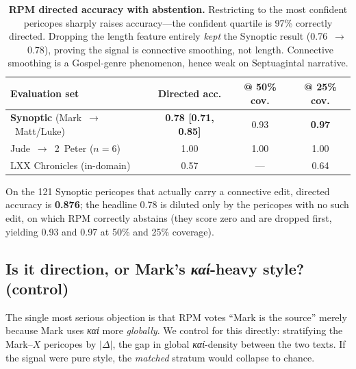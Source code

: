 \documentclass[11pt,letterpaper]{article}
\newcommand{\gk}[1]{{\greekfont\itshape #1}}
\newcommand{\tblhead}{\rowcolor{marine!12}}
\begin{document}
\begin{table}[H]
\centering
\begin{tabular}{lccc}
\toprule
\tblhead\textbf{Evaluation set} & \textbf{Directed acc.} & \textbf{@ 50\% cov.} & \textbf{@ 25\% cov.} \\
\midrule
\rowcolor{terracotta!12}\textbf{Synoptic} (Mark~$\rightarrow$~Matt/Luke) & \textbf{0.78 [0.71, 0.85]} & 0.93 & \textbf{0.97} \\
Jude~$\rightarrow$~2~Peter ($n=6$) & 1.00 & 1.00 & 1.00 \\
LXX Chronicles (in-domain) & 0.57 & --- & 0.64 \\
\bottomrule
\end{tabular}
\caption{\textbf{RPM directed accuracy with abstention.} Restricting to the most confident
pericopes sharply raises accuracy---the confident quartile is 97\% correctly directed. Dropping
the length feature entirely \textit{kept} the Synoptic result (0.76~$\rightarrow$~0.78), proving
the signal is connective smoothing, not length. Connective smoothing is a Gospel-genre
phenomenon, hence weak on Septuagintal narrative.}
\label{tab:rpm}
\end{table}

On the 121 Synoptic pericopes that actually carry a connective edit, directed accuracy is
\textbf{0.876}; the headline 0.78 is diluted only by the pericopes with no such edit, on which
RPM correctly abstains (they score zero and are dropped first, yielding 0.93 and 0.97 at 50\% and
25\% coverage).

\subsection{Is it direction, or Mark's \gk{καί}-heavy style? (control)}

The single most serious objection is that RPM votes ``Mark is the source'' merely because Mark
uses \gk{καί} more \textit{globally}. We control for this directly: stratifying the Mark--$X$
pericopes by $|\Delta|$, the gap in global \gk{καί}-density between the two texts. If the signal
were pure style, the \textit{matched} stratum would collapse to chance.
\end{document}
